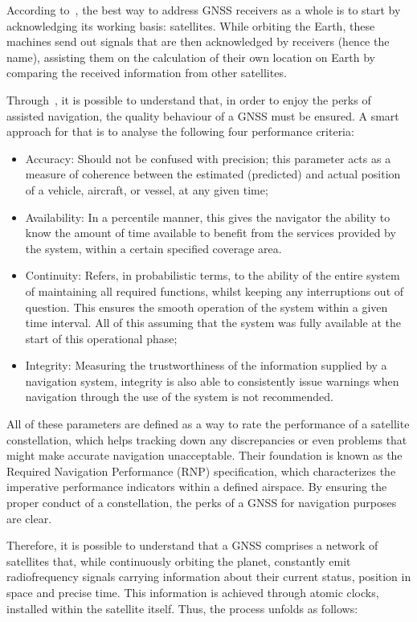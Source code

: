 According to~\cite{novatel_gnss}, the best way to address GNSS receivers as a whole is to start by acknowledging its working basis: satellites. While orbiting the Earth, these machines send out signals that are then acknowledged by receivers (hence the name), assisting them on the calculation of their own location on Earth by comparing the received information from other satellites.

Through~\cite{fed_rad_plan_2008}, it is possible to understand that, in order to enjoy the perks of assisted navigation, the quality behaviour of a GNSS must be ensured.
A smart approach for that is to analyse the following four performance criteria:

\begin{itemize}
    \item Accuracy: Should not be confused with precision; this parameter acts as a measure of coherence between the estimated (predicted) and actual position of a vehicle, aircraft, or vessel, at any given time;
    \item Availability: In a percentile manner, this gives the navigator the ability to know the amount of time available to benefit from the services provided by the system, within a certain specified coverage area.
    \item Continuity: Refers, in probabilistic terms, to the ability of the entire system of maintaining all required functions, whilst keeping any interruptions out of question. This ensures the smooth operation of the system within a given time interval. All of this assuming that the system was fully available at the start of this operational phase;
    \item Integrity: Measuring the trustworthiness of the information supplied by a navigation system, integrity is also able to consistently issue warnings when navigation through the use of the system is not recommended.
\end{itemize}
All of these parameters are defined as a way to rate the performance of a satellite constellation, which helps tracking down any discrepancies or even problems that might make accurate navigation unacceptable.
Their foundation is known as the Required Navigation Performance (RNP) specification, which characterizes the imperative performance indicators within a defined airspace. By ensuring the proper conduct of a constellation, the perks of a GNSS for navigation purposes are clear.

Therefore, it is possible to understand that a GNSS comprises a network of satellites that, while continuously orbiting the planet, constantly emit radiofrequency signals carrying information about their current status, position in space and precise time.
This information is achieved through atomic clocks, installed within the satellite itself. Thus, the process unfolds as follows:

